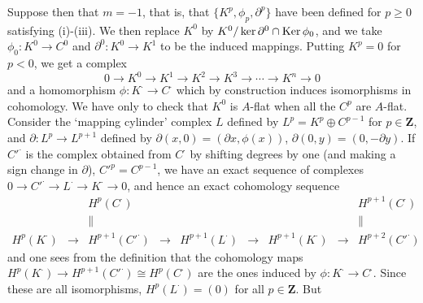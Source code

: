 Suppose then that $m = -1$, that is, that $\{K^p, \phi_p, \partial^p\}$ have
been defined for $p \geq 0$ satisfying (i)-(iii). We then replace $K^0$ by
$K^0 / \ker \partial^0 \cap \operatorname{Ker} \phi_0$, and we take
$\phi_0 : K^0 \to C^0$ and $\partial^0 : K^0 \to K^1$ to be the induced
mappings. Putting $K^p = 0$ for $p < 0$, we get a complex
\[
  0 \to K^0 \to K^1 \to K^2 \to K^3 \to \cdots \to K^n \to 0
\]
and a homomorphism $\phi : K^{\cdot} \to C^{\cdot}$ which by construction
induces isomorphisms in cohomology. We have only to check that $K^0$ is
$A$-flat when all the $C^p$ are $A$-flat. Consider the `mapping cylinder'
complex $L$ defined by $L^p = K^p \oplus C^{p-1}$ for $p \in \mathbf{Z}$,
and $\partial : L^p \to L^{p+1}$ defined by
$\partial(x, 0) = (\partial x, \phi(x))$,
$\partial(0, y) = (0, -\partial y)$. If ${C'}^{\cdot}$ is the complex
obtained from $C^{\cdot}$ by shifting degrees by one (and making a sign
change in $\partial$), ${C'}^p = C^{p-1}$, we have an exact sequence of
complexes $0 \to {C'}^{\cdot} \to L^{\cdot} \to K^{\cdot} \to 0$, and hence
an exact cohomology sequence
\[
\begin{array}{ccccccccc}
 & & H^{p}(C^{\cdot}) & & & & & & H^{p+1}(C^{\cdot}) \\
 & & \| & & & & & & \| \\
H^{p}(K^{\cdot}) & \longrightarrow & H^{p+1}({C'}^{\cdot}) & \longrightarrow
  & H^{p+1}(L^{\cdot}) & \longrightarrow & H^{p+1}(K^{\cdot})
  & \longrightarrow & H^{p+2}({C'}^{\cdot})
\end{array}
\]
and one sees from the definition that the cohomology maps
$H^p(K^{\cdot}) \to H^{p+1}({C'}^{\cdot}) \cong H^p(C^{\cdot})$ are the ones
induced by $\phi : K^{\cdot} \to C^{\cdot}$. Since these are all
isomorphisms, $H^p(L^{\cdot}) = (0)$ for all $p \in \mathbf{Z}$. But
